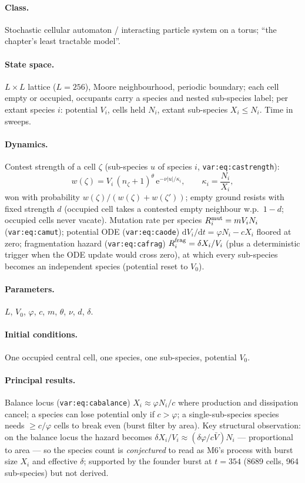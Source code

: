 \documentclass[11pt,a4paper]{article}
\newcommand{\ee}{\mathrm{e}}
\newcommand{\dd}{\mathrm{d}}
\begin{document}
\paragraph{Class.} Stochastic cellular automaton / interacting particle
system on a torus; ``the chapter's least tractable model''.

\paragraph{State space.} $L\times L$ lattice ($L=256$), Moore
neighbourhood, periodic boundary; each cell empty or occupied, occupants
carry a species and nested sub-species label; per extant species $i$:
potential $V_i$, cells held $N_i$, extant sub-species $X_i\le N_i$. Time in
sweeps.

\paragraph{Dynamics.} Contest strength of a cell $\zeta$ (sub-species $u$
of species $i$, \texttt{var:eq:castrength}):
\[
w(\zeta)=V_i\,(n_\zeta+1)^{\theta}\,\ee^{-\nu|u|/\kappa_i},
\qquad \kappa_i=\frac{N_i}{X_i},
\]
won with probability $w(\zeta)/(w(\zeta)+w(\zeta'))$; empty ground resists
with fixed strength $d$ (occupied cell takes a contested empty neighbour
w.p.\ $1-d$; occupied cells never vacate). Mutation rate per species
$R^{\rm mut}_i=mV_iN_i$ (\texttt{var:eq:camut}); potential ODE
(\texttt{var:eq:caode}) $\dd V_i/\dd t=\varphi N_i-cX_i$ floored at zero;
fragmentation hazard (\texttt{var:eq:cafrag}) $R^{\rm frag}_i=\delta X_i/V_i$
(plus a deterministic trigger when the ODE update would cross zero), at
which every sub-species becomes an independent species (potential reset to
$V_0$).

\paragraph{Parameters.} $L$, $V_0$, $\varphi$, $c$, $m$, $\theta$, $\nu$,
$d$, $\delta$.

\paragraph{Initial conditions.} One occupied central cell, one species, one
sub-species, potential $V_0$.

\paragraph{Principal results.} Balance locus (\texttt{var:eq:cabalance})
$X_i\approx\varphi N_i/c$ where production and dissipation cancel; a
species can lose potential only if $c>\varphi$; a single-sub-species
species needs $\ge c/\varphi$ cells to break even (burst filter by area).
Key structural observation: on the balance locus the hazard becomes
$\delta X_i/V_i\approx(\delta\varphi/c\bar V)N_i$ --- proportional to area
--- so the species count is \emph{conjectured} to read as M6's process with
burst size $X_i$ and effective $\delta$; supported by the founder burst at
$t=354$ (8689 cells, 964 sub-species) but not derived.
\end{document}
